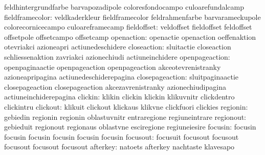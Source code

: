                            feldhintergrundfarbe      barvapozadipole
                           coloresfondocampo         culoarefundalcamp
          fieldframecolor: veldkaderkleur            fieldframecolor
                           feldrahmenfarbe           barvarameckupole
                           colorecornicecampo        culoareframecamp
              fieldoffset: veldoffset                fieldoffset
                           feldoffset                offsetpole
                           offsetcampo               offsetcamp
               openaction: openactie                 openaction
                           oeffenaktion              otevriakci
                           azioneapri                actiunedeschidere
              closeaction: sluitactie                closeaction
                           schliessenaktion          zavriakci
                           azionechiudi              actiuneinchidere
           openpageaction: openpaginaactie           openpageaction
                           openpageaction            akceotevrenistranky
                           azioneapripagina          actiunedeschiderepagina %
          closepageaction: sluitpaginaactie          closepageaction
                           closepageaction           akcezavrenistranky
                           azionechiudipagina        actiuneinchiderepagina %
                  clickin: klikin                    clickin
                           klickin                   klikuvnitr
                           clickdentro               clickintru
                 clickout: klikuit                   clickout
                           klickaus                  klikvne
                           clickfuori                clickies
                 regionin: gebiedin                  regionin
                           regionin                  oblastuvnitr
                           entraregione              regiuneintrare
                regionout: gebieduit                 regionout
                           regionaus                 oblastvne
                           esciregione               regiuneiesire
                  focusin: focusin                   focusin
                           focusin                   focusin
                           focusin                   focusin
                 focusout: focusuit                  focusout
                           focusout                  focusout
                           focusout                  focusout
                 afterkey: natoets                   afterkey
                           nachtaste                 klavesapo
